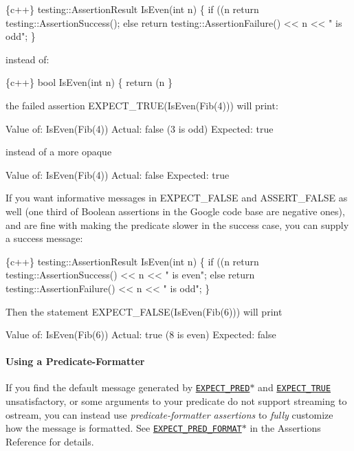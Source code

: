 \begin{DoxyCode}
\{c++\}
testing::AssertionResult IsEven(int n) \{
  if ((n %
    return testing::AssertionSuccess();
  else
    return testing::AssertionFailure() << n << " is odd";
\}
\end{DoxyCode}


instead of\+:


\begin{DoxyCode}
\{c++\}
bool IsEven(int n) \{
  return (n %
\}
\end{DoxyCode}


the failed assertion {\ttfamily E\+X\+P\+E\+C\+T\+\_\+\+T\+R\+UE(Is\+Even(\+Fib(4)))} will print\+:


\begin{DoxyCode}
Value of: IsEven(Fib(4))
  Actual: false (3 is odd)
Expected: true
\end{DoxyCode}


instead of a more opaque


\begin{DoxyCode}
Value of: IsEven(Fib(4))
  Actual: false
Expected: true
\end{DoxyCode}


If you want informative messages in {\ttfamily E\+X\+P\+E\+C\+T\+\_\+\+F\+A\+L\+SE} and {\ttfamily A\+S\+S\+E\+R\+T\+\_\+\+F\+A\+L\+SE} as well (one third of Boolean assertions in the Google code base are negative ones), and are fine with making the predicate slower in the success case, you can supply a success message\+:


\begin{DoxyCode}
\{c++\}
testing::AssertionResult IsEven(int n) \{
  if ((n %
    return testing::AssertionSuccess() << n << " is even";
  else
    return testing::AssertionFailure() << n << " is odd";
\}
\end{DoxyCode}


Then the statement {\ttfamily E\+X\+P\+E\+C\+T\+\_\+\+F\+A\+L\+SE(Is\+Even(\+Fib(6)))} will print


\begin{DoxyCode}
Value of: IsEven(Fib(6))
   Actual: true (8 is even)
Expected: false
\end{DoxyCode}


\paragraph*{Using a Predicate-\/\+Formatter}

If you find the default message generated by \href{reference/assertions.md#EXPECT_PRED}{\tt {\ttfamily E\+X\+P\+E\+C\+T\+\_\+\+P\+R\+E\+D$\ast$}} and \href{reference/assertions.md#EXPECT_TRUE}{\tt {\ttfamily E\+X\+P\+E\+C\+T\+\_\+\+T\+R\+UE}} unsatisfactory, or some arguments to your predicate do not support streaming to {\ttfamily ostream}, you can instead use {\itshape predicate-\/formatter assertions} to {\itshape fully} customize how the message is formatted. See \href{reference/assertions.md#EXPECT_PRED_FORMAT}{\tt {\ttfamily E\+X\+P\+E\+C\+T\+\_\+\+P\+R\+E\+D\+\_\+\+F\+O\+R\+M\+A\+T$\ast$}} in the Assertions Reference for details.

